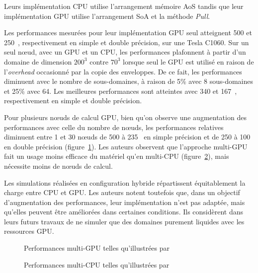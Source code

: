 Leurs implémentation \acs{CPU} utilise l'arrangement mémoire \acs{AoS} tandis que leur implémentation \acs{GPU} utilise l'arrangement \acs{SoA} et la méthode \textit{Pull}.

Les performances mesurées pour leur implémentation \acs{GPU} seul atteignent 500 et 250~, respectivement en simple et double précision, sur une Tesla C1060. Sur un seul nœud, avec un \acs{GPU} et un \acs{CPU}, les performances plafonnent à partir d'un domaine de dimension $200^3$ contre $70^3$ lorsque seul le \acs{GPU} est utilisé en raison de l'\textit{overhead} occasionné par la copie des enveloppes. De ce fait, les performances diminuent avec le nombre de sous-domaines, à raison de 5\% avec 8 sous-domaines et 25\% avec 64. Les meilleures performances sont atteintes avec 340 et 167~, respectivement en simple et double précision.

Pour plusieurs nœuds de calcul \acs{GPU}, bien qu'on observe une augmentation des performances avec celle du nombre de nœuds, les performances relatives diminuent entre 1 et 30 nœuds de 500 à 235~ en simple précision et de 250 à 100~ en double précision (figure~\ref{fig:feichtinger_perf_gpu}). Les auteurs observent que l'approche multi-\acs{GPU} fait un usage moins efficace du matériel qu'en multi-\acs{CPU} (figure~\ref{fig:feichtinger_perf_cpu}), mais nécessite moins de nœuds de calcul.

Les simulations réalisées en configuration hybride répartissent équitablement la charge entre \acs{CPU} et \acs{GPU}. Les auteurs notent toutefois que, dans un objectif d'augmentation des performances, leur implémentation n'est pas adaptée, mais qu'elles peuvent être améliorées dans certaines conditions. Ils considèrent dans leurs futurs travaux de ne simuler que des domaines purement liquides avec les ressources \acs{GPU}.

\begin{figure}[H]
	\centering
	\caption{Performances multi-\acs{GPU} telles qu'illustrées par \cite{feichtinger_flexible_2011}}
	\label{fig:feichtinger_perf_gpu}
\end{figure} 

\begin{figure}[H]
	\centering
	\caption{Performances multi-\acs{CPU} telles qu'illustrées par \cite{feichtinger_flexible_2011}}
	\label{fig:feichtinger_perf_cpu}
\end{figure} 





